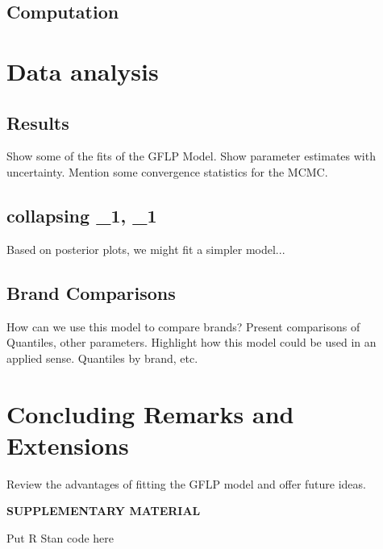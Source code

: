 \documentclass[12pt]{article}
\begin{document}
\subsection{Computation}

\section{Data analysis}
\subsection{Results}
Show some of the fits of the GFLP Model.  Show parameter estimates with uncertainty. Mention some convergence statistics for the MCMC. 
\subsection{collapsing \mu_1, \sigma_1}
Based on posterior plots, we might fit a simpler model...
\subsection{Brand Comparisons}
How can we use this model to compare brands?  Present comparisons of Quantiles, other parameters.  Highlight how this model could be used in an applied sense. Quantiles by brand, etc.
\section{Concluding Remarks and Extensions}
Review the advantages of fitting the GFLP model and offer future ideas.  




    


\bigskip
\begin{center}
{\large\bf SUPPLEMENTARY MATERIAL}
\end{center}

\begin{description}

\item Put R Stan code here

\end{description}



\end{document}
